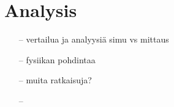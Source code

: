 \section{Analysis}

\begin{itemize}
\item[--]vertailua ja analyysiä simu vs mittaus
\item[--]fysiikan pohdintaa
\item[--]muita ratkaisuja?
\item[--]
\end{itemize}

\clearpage
